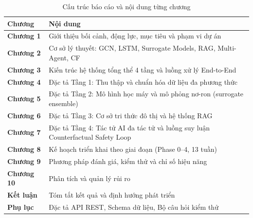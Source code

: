 \begin{table}[H]
\centering
\caption{Cấu trúc báo cáo và nội dung từng chương}
\label{tab:structure}
\renewcommand{\arraystretch}{1.4}
\begin{tabular}{>{\bfseries\centering}p{2.2cm} p{10cm}}
\toprule
\textbf{Chương} & \textbf{Nội dung} \\
\midrule
Chương 1 & Giới thiệu bối cảnh, động lực, mục tiêu và phạm vi dự án \\
\rowcolor{rowgray}
Chương 2 & Cơ sở lý thuyết: GCN, LSTM, Surrogate Models, RAG, Multi-Agent, CF \\
Chương 3 & Kiến trúc hệ thống tổng thể 4 tầng và luồng xử lý End-to-End \\
\rowcolor{rowgray}
Chương 4 & Đặc tả Tầng 1: Thu thập và chuẩn hóa dữ liệu đa phương thức \\
Chương 5 & Đặc tả Tầng 2: Mô hình học máy và mô phỏng nơ-ron (surrogate ensemble) \\
\rowcolor{rowgray}
Chương 6 & Đặc tả Tầng 3: Cơ sở tri thức đô thị và hệ thống RAG \\
Chương 7 & Đặc tả Tầng 4: Tác tử AI đa tác tử và luồng suy luận Counterfactual Safety Loop \\
\rowcolor{rowgray}
Chương 8 & Kế hoạch triển khai theo giai đoạn (Phase 0--4, 13 tuần) \\
Chương 9 & Phương pháp đánh giá, kiểm thử và chỉ số hiệu năng \\
\rowcolor{rowgray}
Chương 10 & Phân tích và quản lý rủi ro \\
Kết luận & Tóm tắt kết quả và định hướng phát triển \\
\rowcolor{rowgray}
Phụ lục & Đặc tả API REST, Schema dữ liệu, Bộ câu hỏi kiểm thử \\
\bottomrule
\end{tabular}
\end{table}
